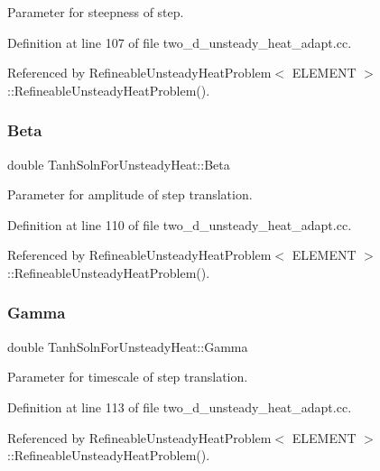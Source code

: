 Parameter for steepness of step. 



Definition at line 107 of file two\+\_\+d\+\_\+unsteady\+\_\+heat\+\_\+adapt.\+cc.



Referenced by Refineable\+Unsteady\+Heat\+Problem$<$ E\+L\+E\+M\+E\+N\+T $>$\+::\+Refineable\+Unsteady\+Heat\+Problem().

\mbox{\label{namespaceTanhSolnForUnsteadyHeat_a66f6116310a5f9f96c2d3bf28250a92b}} 
\subsubsection{\texorpdfstring{Beta}{Beta}}
{\footnotesize\ttfamily double Tanh\+Soln\+For\+Unsteady\+Heat\+::\+Beta}



Parameter for amplitude of step translation. 



Definition at line 110 of file two\+\_\+d\+\_\+unsteady\+\_\+heat\+\_\+adapt.\+cc.



Referenced by Refineable\+Unsteady\+Heat\+Problem$<$ E\+L\+E\+M\+E\+N\+T $>$\+::\+Refineable\+Unsteady\+Heat\+Problem().

\mbox{\label{namespaceTanhSolnForUnsteadyHeat_a5bb742b074ab5f3f65286b1cff1f1512}} 
\subsubsection{\texorpdfstring{Gamma}{Gamma}}
{\footnotesize\ttfamily double Tanh\+Soln\+For\+Unsteady\+Heat\+::\+Gamma}



Parameter for timescale of step translation. 



Definition at line 113 of file two\+\_\+d\+\_\+unsteady\+\_\+heat\+\_\+adapt.\+cc.



Referenced by Refineable\+Unsteady\+Heat\+Problem$<$ E\+L\+E\+M\+E\+N\+T $>$\+::\+Refineable\+Unsteady\+Heat\+Problem().

